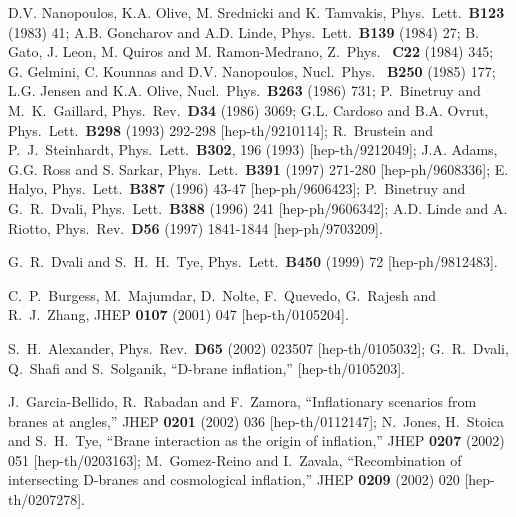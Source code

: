 \documentclass[12pt]{JHEP3}
\begin{document}
\begin{thebibliography}{4}

D.V. Nanopoulos, K.A. Olive, M. Srednicki and K. Tamvakis, Phys.\
Lett.\ {\bf B123} (1983) 41;
%
A.B. Goncharov and A.D. Linde, Phys.\ Lett.\ {\bf B139} (1984) 27;
%
B. Gato, J. Leon, M. Quiros and M. Ramon-Medrano, Z.\ Phys.\ {\bf
C22} (1984) 345;
%
G. Gelmini, C. Kounnas and D.V. Nanopoulos, Nucl.\ Phys.\ {\bf
B250} (1985) 177;
%
L.G. Jensen and K.A. Olive, Nucl.\ Phys.\ {\bf B263} (1986) 731;
%
P.~Binetruy and M.~K.~Gaillard,
Phys.\ Rev.\ {\bf D34} (1986) 3069;
%
G.L. Cardoso and B.A. Ovrut, Phys.\ Lett.\ {\bf B298} (1993)
292-298 [hep-th/9210114];
%
R.~Brustein and P.~J.~Steinhardt,
Phys.\ Lett.\ {\bf B302}, 196 (1993) [hep-th/9212049];
%
J.A. Adams, G.G. Ross and S. Sarkar, Phys.\ Lett.\ {\bf B391}
(1997) 271-280 [hep-ph/9608336];
%
E. Halyo, Phys.\ Lett.\ {\bf B387} (1996) 43-47 [hep-ph/9606423];
%
P.~Binetruy and G.~R.~Dvali,
Phys.\ Lett.\ {\bf B388} (1996) 241 [hep-ph/9606342];
%
A.D. Linde and A. Riotto, Phys.\ Rev.\ {\bf D56} (1997) 1841-1844
[hep-ph/9703209].

G.~R.~Dvali and S.~H.~H.~Tye,
Phys.\ Lett.\ {\bf B450} (1999) 72 [hep-ph/9812483].

C.~P.~Burgess, M.~Majumdar, D.~Nolte, F.~Quevedo, G.~Rajesh and
R.~J.~Zhang,
JHEP {\bf 0107} (2001) 047 [hep-th/0105204].

S.~H.~Alexander,
Phys.\ Rev.\ {\bf D65} (2002) 023507 [hep-th/0105032];
%
G.~R.~Dvali, Q.~Shafi and S.~Solganik, ``D-brane inflation,''
[hep-th/0105203].

J.~Garcia-Bellido, R.~Rabadan and F.~Zamora, ``Inflationary
scenarios from branes at angles,'' JHEP {\bf 0201} (2002) 036
[hep-th/0112147];
%
N.~Jones, H.~Stoica and S.~H.~Tye, ``Brane interaction as the
origin of inflation,'' JHEP {\bf 0207} (2002) 051
[hep-th/0203163];
%
M.~Gomez-Reino and I.~Zavala, ``Recombination of intersecting
D-branes and cosmological inflation,'' JHEP {\bf 0209} (2002) 020
[hep-th/0207278].


\end{thebibliography}
\end{document}
